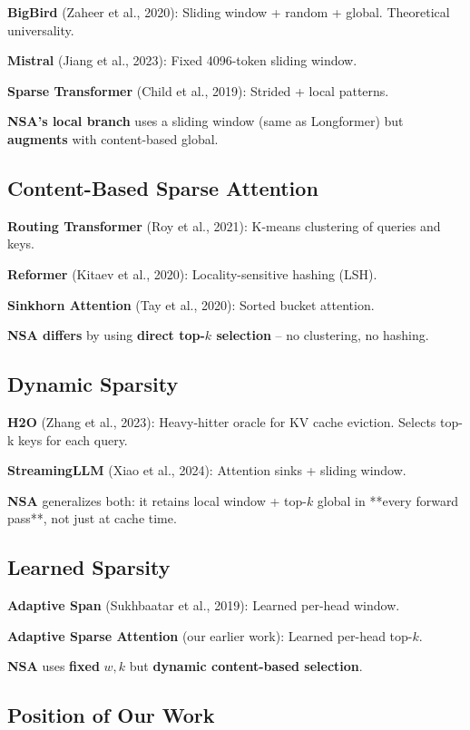 \textbf{BigBird} (Zaheer et al., 2020): Sliding window + random + global. 
Theoretical universality.

\textbf{Mistral} (Jiang et al., 2023): Fixed 4096-token sliding window.

\textbf{Sparse Transformer} (Child et al., 2019): Strided + local patterns.

\textbf{NSA's local branch} uses a sliding window (same as Longformer) but 
\textbf{augments} with content-based global.

\subsection{Content-Based Sparse Attention}

\textbf{Routing Transformer} (Roy et al., 2021): K-means clustering of queries 
and keys.

\textbf{Reformer} (Kitaev et al., 2020): Locality-sensitive hashing (LSH).

\textbf{Sinkhorn Attention} (Tay et al., 2020): Sorted bucket attention.

\textbf{NSA differs} by using \textbf{direct top-$k$ selection} -- no clustering, no 
hashing.

\subsection{Dynamic Sparsity}

\textbf{H2O} (Zhang et al., 2023): Heavy-hitter oracle for KV cache eviction. 
Selects top-k keys for each query.

\textbf{StreamingLLM} (Xiao et al., 2024): Attention sinks + sliding window.

\textbf{NSA} generalizes both: it retains local window + top-$k$ global in **every 
forward pass**, not just at cache time.

\subsection{Learned Sparsity}

\textbf{Adaptive Span} (Sukhbaatar et al., 2019): Learned per-head window.

\textbf{Adaptive Sparse Attention} (our earlier work): Learned per-head top-$k$.

\textbf{NSA} uses \textbf{fixed} $w, k$ but \textbf{dynamic content-based selection}.

\subsection{Position of Our Work}

